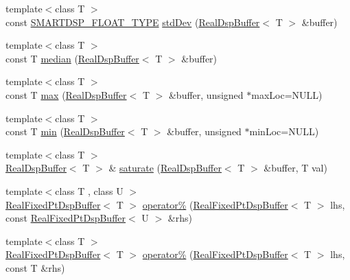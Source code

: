 \begin{DoxyCompactItemize}
\item 
{\footnotesize template$<$class T $>$ }\\const \hyperlink{_dsp_buffer_8h_a9ed4123d332590f7a6161bc2061eac49}{S\+M\+A\+R\+T\+D\+S\+P\+\_\+\+F\+L\+O\+A\+T\+\_\+\+T\+Y\+P\+E} \hyperlink{namespace_smart_dsp_a240f2234a8b22e6d7256906ecdf06665}{std\+Dev} (\hyperlink{class_smart_dsp_1_1_real_dsp_buffer}{Real\+Dsp\+Buffer}$<$ T $>$ \&buffer)
\item 
{\footnotesize template$<$class T $>$ }\\const T \hyperlink{namespace_smart_dsp_a5bffba1eb8a56cbec2a6aa37daed59a3}{median} (\hyperlink{class_smart_dsp_1_1_real_dsp_buffer}{Real\+Dsp\+Buffer}$<$ T $>$ \&buffer)
\item 
{\footnotesize template$<$class T $>$ }\\const T \hyperlink{namespace_smart_dsp_a0bb1b96dde1b4a691e28542504fa428f}{max} (\hyperlink{class_smart_dsp_1_1_real_dsp_buffer}{Real\+Dsp\+Buffer}$<$ T $>$ \&buffer, unsigned $\ast$max\+Loc=N\+U\+L\+L)
\item 
{\footnotesize template$<$class T $>$ }\\const T \hyperlink{namespace_smart_dsp_aec841efe0e5017ac458f6a015ccabdbd}{min} (\hyperlink{class_smart_dsp_1_1_real_dsp_buffer}{Real\+Dsp\+Buffer}$<$ T $>$ \&buffer, unsigned $\ast$min\+Loc=N\+U\+L\+L)
\item 
{\footnotesize template$<$class T $>$ }\\\hyperlink{class_smart_dsp_1_1_real_dsp_buffer}{Real\+Dsp\+Buffer}$<$ T $>$ \& \hyperlink{namespace_smart_dsp_ace4b8a3f0bcdda2e018cc842b82fc127}{saturate} (\hyperlink{class_smart_dsp_1_1_real_dsp_buffer}{Real\+Dsp\+Buffer}$<$ T $>$ \&buffer, T val)
\item 
{\footnotesize template$<$class T , class U $>$ }\\\hyperlink{class_smart_dsp_1_1_real_fixed_pt_dsp_buffer}{Real\+Fixed\+Pt\+Dsp\+Buffer}$<$ T $>$ \hyperlink{namespace_smart_dsp_a3c6a5c05d004e5386c3ffb177491f547}{operator\%} (\hyperlink{class_smart_dsp_1_1_real_fixed_pt_dsp_buffer}{Real\+Fixed\+Pt\+Dsp\+Buffer}$<$ T $>$ lhs, const \hyperlink{class_smart_dsp_1_1_real_fixed_pt_dsp_buffer}{Real\+Fixed\+Pt\+Dsp\+Buffer}$<$ U $>$ \&rhs)
\item 
{\footnotesize template$<$class T $>$ }\\\hyperlink{class_smart_dsp_1_1_real_fixed_pt_dsp_buffer}{Real\+Fixed\+Pt\+Dsp\+Buffer}$<$ T $>$ \hyperlink{namespace_smart_dsp_a74346f60d1642f93440ef0e93f824cf6}{operator\%} (\hyperlink{class_smart_dsp_1_1_real_fixed_pt_dsp_buffer}{Real\+Fixed\+Pt\+Dsp\+Buffer}$<$ T $>$ lhs, const T \&rhs)

\end{DoxyCompactItemize}

